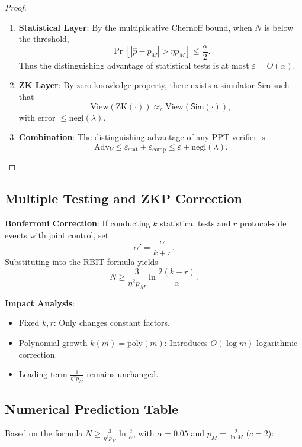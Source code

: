 \documentclass[12pt]{article}
\theoremstyle{plain}
\theoremstyle{definition}
\begin{document}
\begin{proof}
\begin{enumerate}
\item \textbf{Statistical Layer}: By the multiplicative Chernoff bound, when $N$ is below the threshold,
\[
\Pr[|\hat{p} - p_M| > \eta p_M] \le \frac{\alpha}{2}.
\]
Thus the distinguishing advantage of statistical tests is at most $\varepsilon = O(\alpha)$.

\item \textbf{ZK Layer}: By zero-knowledge property, there exists a simulator $\mathsf{Sim}$ such that
\[
\text{View}(\text{ZK}(\cdot)) \approx_c \text{View}(\mathsf{Sim}(\cdot)),
\]
with error $\le \text{negl}(\lambda)$.

\item \textbf{Combination}: The distinguishing advantage of any PPT verifier is
\[
\text{Adv}_V \le \varepsilon_{\text{stat}} + \varepsilon_{\text{comp}} \le \varepsilon + \text{negl}(\lambda).
\]
\end{enumerate}
\end{proof}

\subsection{Multiple Testing and ZKP Correction}

\textbf{Bonferroni Correction}\cite{bonferroni1936}: If conducting $k$ statistical tests and $r$ protocol-side events with joint control, set
\[
\alpha' = \frac{\alpha}{k+r}.
\]
Substituting into the RBIT formula yields
\[
N \ge \frac{3}{\eta^2 p_M} \ln \frac{2(k+r)}{\alpha}.
\]

\textbf{Impact Analysis}:
\begin{itemize}
\item Fixed $k, r$: Only changes constant factors.
\item Polynomial growth $k(m) = \text{poly}(m)$: Introduces $O(\log m)$ logarithmic correction.
\item Leading term $\frac{1}{\eta^2 p_M}$ remains unchanged.
\end{itemize}

\subsection{Numerical Prediction Table}

Based on the formula $N \ge \frac{3}{\eta^2 p_M} \ln \frac{2}{\alpha}$, with $\alpha=0.05$ and $p_M = \frac{2}{\ln M}$ ($c=2$):
\end{document}
